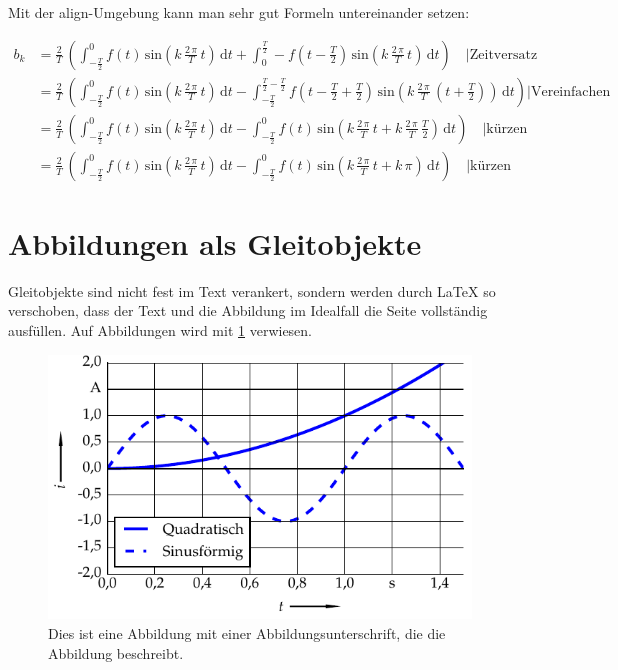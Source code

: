 Mit der align-Umgebung kann man sehr gut Formeln untereinander setzen:

\begin{align*}
b_{k} & =\frac{2}{T}\,\left(\int_{-\frac{T}{2}}^{0}f\left(t\right)\,\mathrm{sin}\left(k\,\frac{2\,\pi}{T}\,t\right)\,\mathrm{d}t+\int_{0}^{\frac{T}{2}}-f\left(t-\frac{T}{2}\right)\,\mathrm{sin}\left(k\,\frac{2\,\pi}{T}\,t\right)\,\mathrm{d}t\right)\quad\biggl|\text{Zeitversatz}\\
 & =\frac{2}{T}\,\left(\int_{-\frac{T}{2}}^{0}f\left(t\right)\,\mathrm{sin}\left(k\,\frac{2\,\pi}{T}\,t\right)\,\mathrm{d}t-\int_{-\frac{T}{2}}^{\frac{T}{2}-\frac{T}{2}}f\left(t-\frac{T}{2}+\frac{T}{2}\right)\,\mathrm{sin}\left(k\,\frac{2\,\pi}{T}\,\left(t+\frac{T}{2}\right)\right)\,\mathrm{d}t\right)\biggl|\text{Vereinfachen}\\
 & =\frac{2}{T}\,\left(\int_{-\frac{T}{2}}^{0}f\left(t\right)\,\mathrm{sin}\left(k\,\frac{2\,\pi}{T}\,t\right)\,\mathrm{d}t-\int_{-\frac{T}{2}}^{0}f\left(t\right)\,\mathrm{sin}\left(k\,\frac{2\,\pi}{T}\,t+k\,\frac{2\,\pi}{T}\,\frac{T}{2}\right)\,\mathrm{d}t\right)\quad\biggl|\text{kürzen}\\
 & =\frac{2}{T}\,\left(\int_{-\frac{T}{2}}^{0}f\left(t\right)\,\mathrm{sin}\left(k\,\frac{2\,\pi}{T}\,t\right)\,\mathrm{d}t-\int_{-\frac{T}{2}}^{0}f\left(t\right)\,\mathrm{sin}\left(k\,\frac{2\,\pi}{T}\,t+k\,\pi\right)\,\mathrm{d}t\right)\quad\biggl|\text{kürzen}
\end{align*}


\section{Abbildungen als Gleitobjekte}

Gleitobjekte sind nicht fest im Text verankert, sondern werden durch
LaTeX so verschoben, dass der Text und die Abbildung im Idealfall
die Seite vollständig ausfüllen. Auf Abbildungen wird mit \ref{fig:plots}
verwiesen.

\begin{figure}
\hfill{}\includegraphics{figures/01plot/plotdin}\hfill{}\null

\caption{Dies ist eine Abbildung mit einer Abbildungsunterschrift, die die
Abbildung beschreibt.}
\label{fig:plots}

\end{figure}

